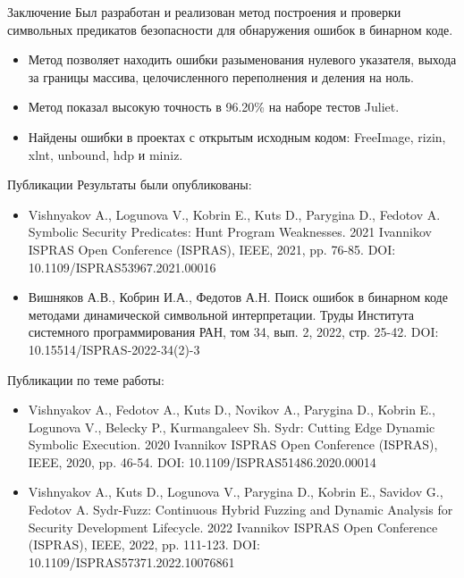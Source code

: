 \documentclass[10pt]{beamer}
\begin{document}
\begin{frame}{Заключение}
Был разработан и реализован метод построения и проверки символьных
предикатов безопасности для обнаружения ошибок в бинарном коде.
\begin{itemize}
    \item Метод позволяет находить ошибки разыменования нулевого указателя,
        выхода за границы массива, целочисленного переполнения и деления на
        ноль.
    \item Метод показал высокую
        точность в 96.20\% на наборе тестов Juliet.
    \item Найдены ошибки в проектах с открытым исходным кодом:
        FreeImage, rizin, xlnt, unbound, hdp и miniz.
\end{itemize}
\end{frame}

\begin{frame}{Публикации}
\footnotesize
Результаты были опубликованы:
\begin{itemize}
    \item Vishnyakov A., Logunova V., Kobrin E., Kuts D., Parygina D., Fedotov A. Symbolic Security Predicates: Hunt Program Weaknesses. 2021 Ivannikov ISPRAS Open Conference (ISPRAS), IEEE, 2021, pp. 76-85. DOI: 10.1109/ISPRAS53967.2021.00016
    \item Вишняков А.В., Кобрин И.А., Федотов А.Н. Поиск ошибок в бинарном коде методами динамической символьной интерпретации. Труды Института системного программирования РАН, том 34, вып. 2, 2022, стр. 25-42. DOI: 10.15514/ISPRAS-2022-34(2)-3
\end{itemize}

Публикации по теме работы:
\begin{itemize}
    \item Vishnyakov A., Fedotov A., Kuts D., Novikov A., Parygina D., Kobrin E., Logunova V., Belecky P., Kurmangaleev Sh. Sydr: Cutting Edge Dynamic Symbolic Execution. 2020 Ivannikov ISPRAS Open Conference (ISPRAS), IEEE, 2020, pp. 46-54. DOI: 10.1109/ISPRAS51486.2020.00014
    \item Vishnyakov A., Kuts D., Logunova V., Parygina D., Kobrin E., Savidov G., Fedotov A. Sydr-Fuzz: Continuous Hybrid Fuzzing and Dynamic Analysis for Security Development Lifecycle. 2022 Ivannikov ISPRAS Open Conference (ISPRAS), IEEE, 2022, pp. 111-123. DOI: 10.1109/ISPRAS57371.2022.10076861
\end{itemize}
\end{frame}
\end{document}
